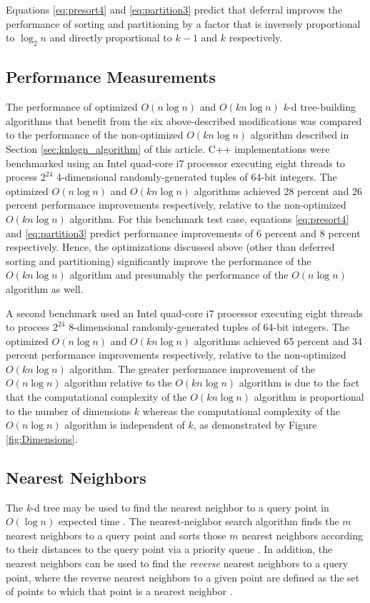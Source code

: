 \documentclass{sig-alternate}
\begin{document}
Equations \ref{eq:presort4} and \ref{eq:partition3} predict that deferral improves the performance of sorting and partitioning by a factor that is inversely proportional to $\log_2 n$ and directly proportional to $k - 1$ and $k$ respectively.

\subsection{Performance Measurements}

The performance of optimized $O\left(n \log n\right)$ and $O\left(kn \log n\right)$ \emph{k}-d tree-building algorithms that benefit from the six above-described modifications was compared to the performance of the non-optimized $O\left(kn \log n\right)$ algorithm described in Section \ref{sec:knlogn_algorithm} of this article. C++ implementations were benchmarked using an Intel quad-core i7 processor executing eight threads to process $2^{24}$ 4-dimensional randomly-generated tuples of 64-bit integers.  The optimized $O\left(n \log n\right)$ and $O\left(kn \log n\right)$ algorithms achieved 28 percent and 26 percent performance improvements respectively, relative to the non-optimized $O\left(kn \log n\right)$ algorithm.  For this benchmark test case, equations \ref{eq:presort4} and \ref{eq:partition3} predict performance improvements of 6 percent and 8 percent respectively.  Hence, the optimizations discussed above (other than deferred sorting and partitioning) significantly improve the performance of the $O\left(kn \log n\right)$ algorithm and presumably the performance of the $O\left(n \log n\right)$ algorithm as well.

A second benchmark used an Intel quad-core i7 processor executing eight threads to process $2^{24}$ 8-dimensional randomly-generated tuples of 64-bit integers.  The optimized $O\left(n \log n\right)$ and $O\left(kn \log n\right)$ algorithms achieved 65 percent and 34 percent performance improvements respectively, relative to the non-optimized $O\left(kn \log n\right)$ algorithm.   The greater performance improvement of the $O\left(n \log n\right)$ algorithm relative to the $O\left(kn \log n\right)$ algorithm is due to the fact that the computational complexity of the $O\left(kn \log n\right)$ algorithm is proportional to the number of dimensions $k$ whereas the computational complexity of the $O\left(n \log n\right)$ algorithm is independent of $k$, as demonstrated by Figure \ref{fig:Dimensions}.

\subsection{Nearest Neighbors}
The \emph{k}-d tree may be used to find the nearest neighbor to a query point in $O\left(\log n\right)$ expected time \cite{Friedman}. The nearest-neighbor search algorithm finds the $m$ nearest neighbors to a query point and sorts those $m$ nearest neighbors according to their distances to the query point via a priority queue \cite{Sedgewick3}. In addition, the nearest neighbors can be used to find the \emph{reverse} nearest neighbors to a query point, where the reverse nearest neighbors to a given point are defined as the set of points to which that point is a nearest neighbor \cite{Korn}.
\end{document}

